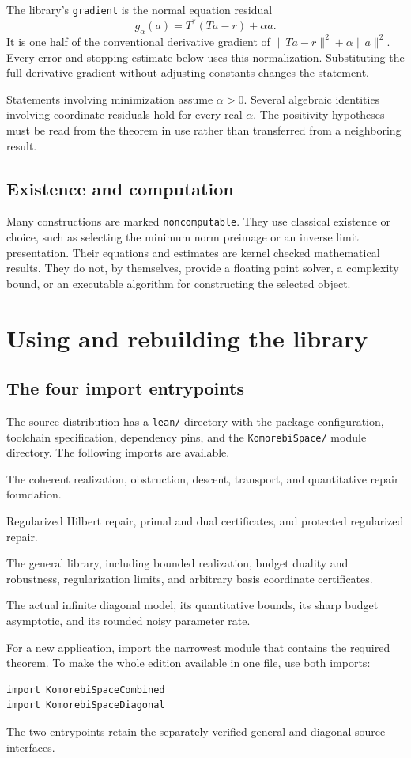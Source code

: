 \documentclass[11pt]{article}
\newcommand{\leanname}[1]{{\small\ttfamily\nolinkurl{#1}}}
\newcommand{\guidechapter}[1]{\par\Needspace{8\baselineskip}\section{#1}}
\begin{document}
The library's \leanname{gradient} is the normal equation residual
\[
 g_\alpha(a)=T^*(Ta-r)+\alpha a.
\]
It is one half of the conventional derivative gradient of $\|Ta-r\|^2+\alpha\|a\|^2$. Every error and stopping estimate below uses this normalization. Substituting the full derivative gradient without adjusting constants changes the statement.

Statements involving minimization assume $\alpha>0$. Several algebraic identities involving coordinate residuals hold for every real $\alpha$. The positivity hypotheses must be read from the theorem in use rather than transferred from a neighboring result.

\subsection{Existence and computation}
Many constructions are marked \leanname{noncomputable}. They use classical existence or choice, such as selecting the minimum norm preimage or an inverse limit presentation. Their equations and estimates are kernel checked mathematical results. They do not, by themselves, provide a floating point solver, a complexity bound, or an executable algorithm for constructing the selected object.

\guidechapter{Using and rebuilding the library}
\subsection{The four import entrypoints}
The source distribution has a \leanname{lean/} directory with the package configuration, toolchain specification, dependency pins, and the \leanname{KomorebiSpace/} module directory. The following imports are available.
\begin{description}[style=nextline]
\item[\leanname{KomorebiSpace}] The coherent realization, obstruction, descent, transport, and quantitative repair foundation.
\item[\leanname{KomorebiSpaceRegularization}] Regularized Hilbert repair, primal and dual certificates, and protected regularized repair.
\item[\leanname{KomorebiSpaceCombined}] The general library, including bounded realization, budget duality and robustness, regularization limits, and arbitrary basis coordinate certificates.
\item[\leanname{KomorebiSpaceDiagonal}] The actual infinite diagonal model, its quantitative bounds, its sharp budget asymptotic, and its rounded noisy parameter rate.
\end{description}
For a new application, import the narrowest module that contains the required theorem. To make the whole edition available in one file, use both imports:
\begin{verbatim}
import KomorebiSpaceCombined
import KomorebiSpaceDiagonal
\end{verbatim}
The two entrypoints retain the separately verified general and diagonal source interfaces.
\end{document}
